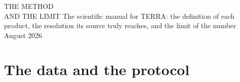\documentclass[11pt,a4paper,oneside]{book}
\begin{document}
\frontmatter

%
\terracapaperiodico
  {THE METHOD\\AND THE LIMIT}
  {The scientific manual for TERRA: the definition of each product, the
   resolution its source truly reaches, and the limit of the number}
  {August 2026}

%
%
\tableofcontents
\clearpage





\mainmatter

\part{The data and the protocol}



\end{document}
